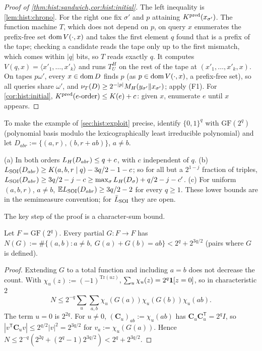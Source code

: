 \begin{proof}[Proof of \cref{thm:hist:sandwich,cor:hist:initial}]
The left inequality is \cref{lem:hist:chrono}. For the right one fix $\sigma'$ and $p$ attaining $K^{\mathrm{pred}}(x_{\sigma'})$. The function machine $T$, which does not depend on $p$, on query $x$ enumerates the prefix-free set $\operatorname{dom} V(\cdot,x)$ and takes the first element $q$ found that is a prefix of the tape; checking a candidate reads the tape only up to the first mismatch, which comes within $|q|$ bits, so $T$ reads exactly $q$. %
It computes $V(q,x)=\langle x'_1,\dots,x'_k\rangle$ and runs $T^H_U$ on the rest of the tape at $(x'_1,\dots,x'_k,x)$. On tapes $p\omega'$, every $x\in\operatorname{dom} D$ finds $p$ (as $p\in\operatorname{dom} V(\cdot,x)$, a prefix-free set), so all queries share $\omega'$, and $\nu_T(D)\ge2^{-|p|}M_{H}(y_{\sigma'}\Vert x_{\sigma'})$; apply (F1). For \cref{cor:hist:initial}, $K^{\mathrm{pred}}(e\text{-order})\le K(e)+c$: given $x$, enumerate $e$ until $x$ appears.
\end{proof}

To make the example of \cref{sec:hist:exploit} precise, identify $\{0,1\}^q$ with $\mathrm{GF}(2^q)$ (polynomial basis modulo the lexicographically least irreducible polynomial) and let $D_{abr}:=\{(a,r),(b,r+ab)\}$, $a\ne b$.

\begin{theorem}\label{thm:hist:gf}
(a) In both orders $L_{H}(D_{abr})\le q+c$, with $c$ independent of $q$. (b) $L_{\mathrm{SOI}}(D_{abr})\ge K(a,b,r\mid q)-3q/2-1-c$; so for all but a $2^{1-j}$ fraction of triples, $L_{\mathrm{SOI}}(D_{abr})\ge3q/2-j-c\ge\max_\sigma L_{H}(D_\sigma)+q/2-j-c'$. (c) For uniform $(a,b,r)$, $a\ne b$, $\mathbb{E}L_{\mathrm{SOI}}(D_{abr})\ge3q/2-2$ for every $q\ge1$. These lower bounds are in the semimeasure convention; for $\bar{L}_{\mathrm{SOI}}$ they are open.
\end{theorem}

The key step of the proof is a character-sum bound.

\begin{lemma}\label{lem:hist:charsum}
Let $F=\mathrm{GF}(2^q)$. Every partial $G:F\to F$ has $N(G):=\#\{(a,b):a\ne b,\ G(a)+G(b)=ab\}<2^q+2^{3q/2}$ (pairs where $G$ is defined).
\end{lemma}

\begin{proof}
Extending $G$ to a total function and including $a=b$ does not decrease the count. With $\chi_u(z):=(-1)^{\mathrm{Tr}(uz)}$, $\sum_u\chi_u(z)=2^q\mathbf{1}[z=0]$, so in characteristic $2$
\[N\le2^{-q}\textstyle\sum_u\sum_{a,b}\chi_u(G(a))\chi_u(G(b))\chi_u(ab).\]
The term $u=0$ is $2^{2q}$. For $u\ne0$, $(\mathbf C_u)_{ab}:=\chi_u(ab)$ has $\mathbf C_u\mathbf C_u^{\mathsf T}=2^qI$, so $|v^{\mathsf T}\mathbf C_uv|\le2^{q/2}|v|^2=2^{3q/2}$ for $v_a:=\chi_u(G(a))$. Hence $N\le2^{-q}(2^{2q}+(2^q-1)2^{3q/2})<2^q+2^{3q/2}$.
\end{proof}


